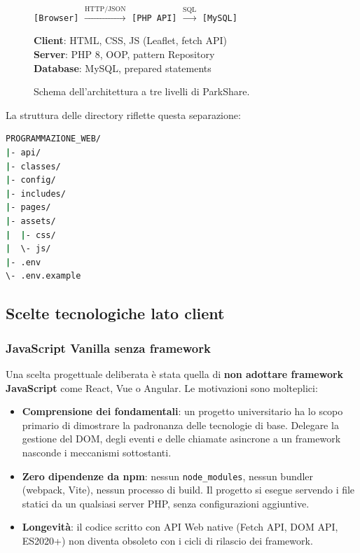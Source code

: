 \documentclass[12pt, a4paper]{article}
\begin{document}
\begin{figure}[H]
\centering
\begin{mdframed}[linecolor=codeframe, linewidth=1pt]
\begin{center}
\texttt{[Browser]} $\xrightarrow{\text{HTTP/JSON}}$ \texttt{[PHP API]} $\xrightarrow{\text{SQL}}$ \texttt{[MySQL]}
\end{center}
\vspace{0.3cm}
\small
\textbf{Client}: HTML, CSS, JS (Leaflet, fetch API)\\
\textbf{Server}: PHP 8, OOP, pattern Repository\\
\textbf{Database}: MySQL, prepared statements
\end{mdframed}
\caption{Schema dell'architettura a tre livelli di ParkShare.}
\end{figure}

La struttura delle directory riflette questa separazione:

\begin{lstlisting}[language=bash, caption={Struttura del progetto ParkShare.}]
PROGRAMMAZIONE_WEB/
|- api/
|- classes/
|- config/
|- includes/
|- pages/
|- assets/
|  |- css/
|  \- js/
|- .env
\- .env.example
\end{lstlisting}

\subsection{Scelte tecnologiche lato client}

\subsubsection{JavaScript Vanilla senza framework}

Una scelta progettuale deliberata è stata quella di \textbf{non adottare framework
JavaScript} come React, Vue o Angular. Le motivazioni sono molteplici:

\begin{itemize}
    \item \textbf{Comprensione dei fondamentali}: un progetto universitario ha lo scopo
    primario di dimostrare la padronanza delle tecnologie di base. Delegare la gestione
    del DOM, degli eventi e delle chiamate asincrone a un framework nasconde i meccanismi
    sottostanti.

    \item \textbf{Zero dipendenze da npm}: nessun \texttt{node\_modules}, nessun
    bundler (webpack, Vite), nessun processo di build. Il progetto si esegue servendo
    i file statici da un qualsiasi server PHP, senza configurazioni aggiuntive.

    \item \textbf{Longevità}: il codice scritto con API Web native (Fetch API, DOM API,
    ES2020+) non diventa obsoleto con i cicli di rilascio dei framework.
\end{itemize}
\end{document}
